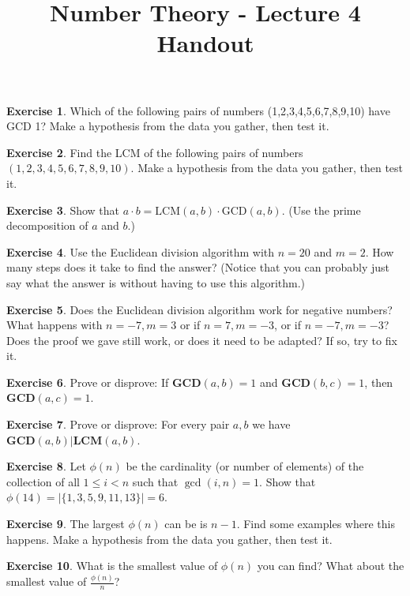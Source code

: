 \documentclass[11pt]{article}
\theoremstyle{definition}
\newtheorem{exercise}{Exercise}
\numberwithin{thm}{section}
\begin{document}
\title{Number Theory - Lecture 4 Handout}

\maketitle


\begin{exercise} Which of the following pairs of numbers (1,2,3,4,5,6,7,8,9,10) have GCD 1? Make a hypothesis from the data you gather, then test it.
\end{exercise}

\begin{exercise} Find the LCM of the following pairs of numbers $(1,2,3,4,5,6,7,8,9,10)$. Make a hypothesis from the data you gather, then test it.
\end{exercise}

\begin{exercise} Show that $a\cdot b = \text{LCM}(a,b)\cdot\text{GCD}(a,b)$. (Use the prime decomposition of $a$ and $b$.)
\end{exercise}

\begin{exercise} Use the Euclidean division algorithm with $n = 20$ and $m = 2$. How many steps does it take to find the answer? (Notice that you can probably just say what the answer is without having to use this algorithm.)
\end{exercise}

\begin{exercise} Does the Euclidean division algorithm work for negative numbers? What happens with $n = -7, m = 3$ or if $n = 7, m = -3$, or if $n = -7, m=-3$? Does the proof we gave still work, or does it need to be adapted? If so, try to fix it.
\end{exercise}

\begin{exercise} Prove or disprove: If $\textbf{GCD}(a,b) = 1$ and $\textbf{GCD}(b,c) = 1$, then $\textbf{GCD}(a,c) = 1$.
\end{exercise}

\begin{exercise} Prove or disprove: For every pair $a,b$ we have $\textbf{GCD}(a,b) | \textbf{LCM}(a,b)$.
\end{exercise}

\begin{exercise} Let $\phi(n)$ be the cardinality (or number of elements) of the collection of all $1 \leq i < n$ such that $\gcd(i,n) = 1$. Show that $\phi(14) = |\{1,3,5,9,11,13\}| = 6$.
\end{exercise}

\begin{exercise} The largest $\phi(n)$ can be is $n-1$. Find some examples where this happens. Make a hypothesis from the data you gather, then test it.
\end{exercise}

\begin{exercise} What is the smallest value of $\phi(n)$ you can find? What about the smallest value of $\frac{\phi(n)}{n}$?
\end{exercise}
\end{document}
